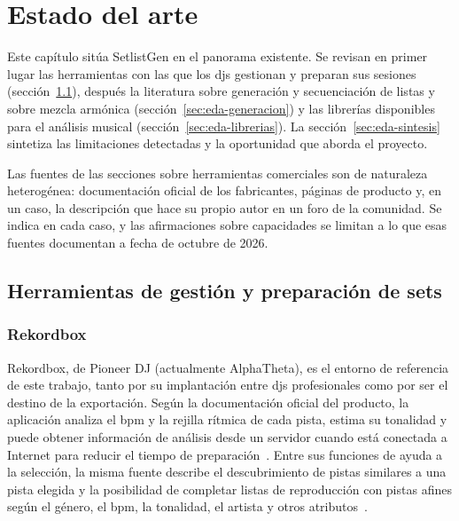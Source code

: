 
\chapter{Estado del arte}
\label{cha:estado-del-arte}

Este capítulo sitúa SetlistGen en el panorama existente. Se revisan en primer lugar las herramientas con las que los \acsp{dj} gestionan y preparan sus sesiones (sección~\ref{sec:eda-herramientas}), después la literatura sobre generación y secuenciación de listas y sobre mezcla armónica (sección~\ref{sec:eda-generacion}) y las librerías disponibles para el análisis musical (sección~\ref{sec:eda-librerias}). La sección~\ref{sec:eda-sintesis} sintetiza las limitaciones detectadas y la oportunidad que aborda el proyecto.

Las fuentes de las secciones sobre herramientas comerciales son de naturaleza heterogénea: documentación oficial de los fabricantes, páginas de producto y, en un caso, la descripción que hace su propio autor en un foro de la comunidad. Se indica en cada caso, y las afirmaciones sobre capacidades se limitan a lo que esas fuentes documentan a fecha de octubre de 2026.

\section{Herramientas de gestión y preparación de sets}
\label{sec:eda-herramientas}

\subsection{Rekordbox}

Rekordbox, de Pioneer DJ (actualmente AlphaTheta), es el entorno de referencia de este trabajo, tanto por su implantación entre \acsp{dj} profesionales como por ser el destino de la exportación. Según la documentación oficial del producto, la aplicación analiza el \acs{bpm} y la rejilla rítmica de cada pista, estima su tonalidad y puede obtener información de análisis desde un servidor cuando está conectada a Internet para reducir el tiempo de preparación~\cite{rekordbox_features}. Entre sus funciones de ayuda a la selección, la misma fuente describe el descubrimiento de pistas similares a una pista elegida y la posibilidad de completar listas de reproducción con pistas afines según el género, el \acs{bpm}, la tonalidad, el artista y otros atributos~\cite{rekordbox_features}.

